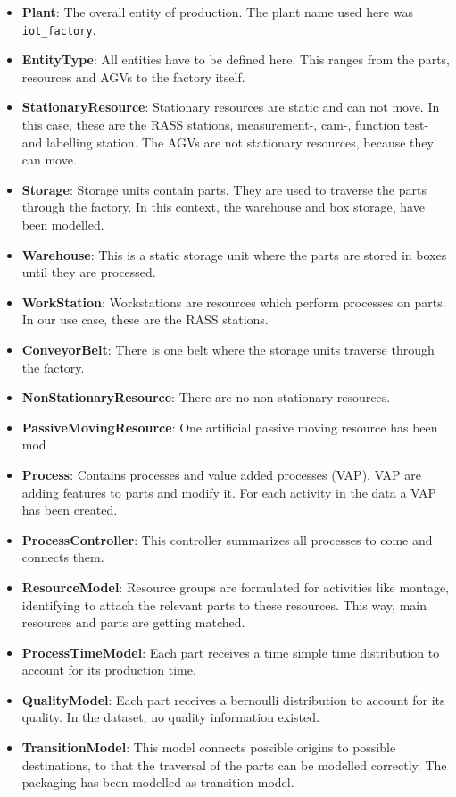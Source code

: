 \begin{itemize}
  \item \textbf{Plant}: The overall entity of production. The plant name used here was \texttt{iot\_factory}.
  \item \textbf{EntityType}: All entities have to be defined here. This ranges from the parts, resources and AGVs to the factory itself.
  \item \textbf{StationaryResource}: Stationary resources are static and can not move. In this case, these are the RASS stations, measurement-, cam-, function test- and labelling station. The AGVs are not stationary resources, because they can move.
  \item \textbf{Storage}: Storage units contain parts. They are used to traverse the parts through the factory. In this context, the warehouse and box storage, have been modelled.
  \item \textbf{Warehouse}: This is a static storage unit where the parts are stored in boxes until they are processed.
  \item \textbf{WorkStation}: Workstations are resources which perform processes on parts. In our use case, these are the RASS stations.
  \item \textbf{ConveyorBelt}: There is one belt where the storage units traverse through the factory.
  \item \textbf{NonStationaryResource}: There are no non-stationary resources.
  \item \textbf{PassiveMovingResource}: One artificial passive moving resource has been mod
  \item \textbf{Process}: Contains processes and value added processes (VAP). VAP are adding features to parts and modify it. For each activity in the data a VAP has been created.
  \item \textbf{ProcessController}: This controller summarizes all processes to come and connects them.
  \item \textbf{ResourceModel}: Resource groups are formulated for activities like montage, identifying to attach the relevant parts to these resources. This way, main resources and parts are getting matched.
  \item \textbf{ProcessTimeModel}: Each part receives a time simple time distribution to account for its production time.
  \item \textbf{QualityModel}: Each part receives a bernoulli distribution to account for its quality. In the dataset, no quality information existed.
  \item \textbf{TransitionModel}: This model connects possible origins to possible destinations, to that the traversal of the parts can be modelled correctly. The packaging has been modelled as transition model.

\end{itemize}
